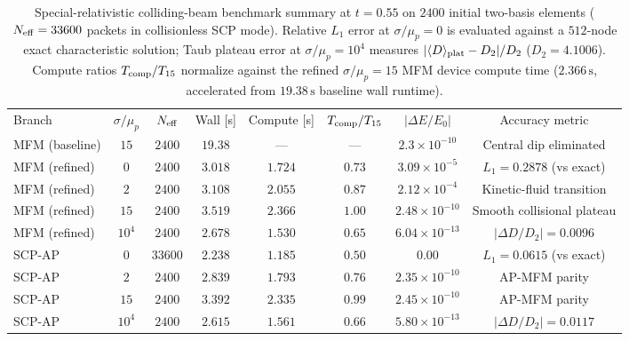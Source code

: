 \documentclass[twocolumn,prx,aps,superscriptaddress,nofootinbib,floatfix]{revtex4-2}
\begin{document}
\begin{table}[t]
\caption{\label{tab:supp_sr}%
Special-relativistic colliding-beam benchmark summary at $t = 0.55$ on $2400$ initial two-basis elements ($N_{\rm eff} = 33600$ packets in collisionless SCP mode). Relative $L_1$ error at $\sigma/\mu_p = 0$ is evaluated against a $512$-node exact characteristic solution; Taub plateau error at $\sigma/\mu_p = 10^4$ measures $|\langle D \rangle_{\rm plat} - D_2|/D_2$ ($D_2 = 4.1006$). Compute ratios $T_{\rm comp}/T_{15}$ normalize against the refined $\sigma/\mu_p = 15$ MFM device compute time ($2.366\,\mathrm{s}$, accelerated from $19.38\,\mathrm{s}$ baseline wall runtime).}
\begin{ruledtabular}
\begin{tabular}{lccccccc}
Branch & $\sigma / \mu_p$ & $N_{\rm eff}$ & Wall [s] & Compute [s] & $T_{\rm comp}/T_{15}$ & $|\Delta E/E_0|$ & Accuracy metric \\
\colrule
MFM (baseline) & $15$ & $2400$ & $19.38$ & --- & --- & $2.3\times 10^{-10}$ & Central dip eliminated \\
MFM (refined) & $0$ & $2400$ & $3.018$ & $1.724$ & $0.73$ & $3.09\times 10^{-5}$ & $L_1 = 0.2878$ (vs exact) \\
MFM (refined) & $2$ & $2400$ & $3.108$ & $2.055$ & $0.87$ & $2.12\times 10^{-4}$ & Kinetic-fluid transition \\
MFM (refined) & $15$ & $2400$ & $3.519$ & $2.366$ & $1.00$ & $2.48\times 10^{-10}$ & Smooth collisional plateau \\
MFM (refined) & $10^4$ & $2400$ & $2.678$ & $1.530$ & $0.65$ & $6.04\times 10^{-13}$ & $|\Delta D/D_2| = 0.0096$ \\
SCP-AP & $0$ & $33600$ & $2.238$ & $1.185$ & $0.50$ & $0.00$ & $L_1 = 0.0615$ (vs exact) \\
SCP-AP & $2$ & $2400$ & $2.839$ & $1.793$ & $0.76$ & $2.35\times 10^{-10}$ & AP-MFM parity \\
SCP-AP & $15$ & $2400$ & $3.392$ & $2.335$ & $0.99$ & $2.45\times 10^{-10}$ & AP-MFM parity \\
SCP-AP & $10^4$ & $2400$ & $2.615$ & $1.561$ & $0.66$ & $5.80\times 10^{-13}$ & $|\Delta D/D_2| = 0.0117$ \\
\end{tabular}
\end{ruledtabular}
\end{table}
\end{document}
